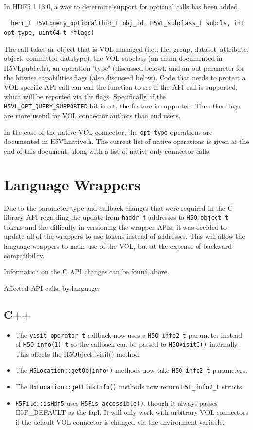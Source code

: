 In HDF5 1.13.0, a way to determine support for optional calls has been added.

\begin{lstlisting}
  herr_t H5VLquery_optional(hid_t obj_id, H5VL_subclass_t subcls, int opt_type, uint64_t *flags)
\end{lstlisting}

The call takes an object that is VOL managed (i.e.; file, group, dataset, attribute, object, committed datatype), the VOL subclass (an enum documented in H5VLpublic.h), an operation "type" (discussed below), and an out parameter for the bitwise capabilities flags (also discussed below). Code that needs to protect a VOL-specific API call can call the function to see if the API call is supported, which will be reported via the flags. Specifically, if the {\tt H5VL\_OPT\_QUERY\_SUPPORTED} bit is set, the feature is supported. The other flags are more useful for VOL connector authors than end users.

In the case of the native VOL connector, the {\tt opt\_type} operations are documented in H5VLnative.h. The current list of native operations is given at the end of this document, along with a list of native-only connector calls.


\section{Language Wrappers}

Due to the parameter type and callback changes that were required in the C
library API regarding the update from {\tt haddr\_t} addresses to
{\tt H5O\_object\_t} tokens and the difficulty in versioning the wrapper
APIs, it was decided to update all of the wrappers to use tokens instead
of addresses. This will allow the language wrappers to make use of the VOL,
but at the expense of backward compatibility.

Information on the C API changes can be found above.

Affected API calls, by language:

\subsection{C++}

\begin{itemize}
    \item The {\tt visit\_operator\_t} callback now uses a {\tt H5O\_info2\_t} parameter instead of {\tt H5O\_info(1)\_t} so the callback can be passed to {\tt H5Ovisit3()} internally. This affects the H5Object::visit() method.
    \item The {\tt H5Location::getObjinfo()} methods now take {\tt H5O\_info2\_t} parameters.
    \item The {\tt H5Location::getLinkInfo()} methods now return {\tt H5L\_info2\_t} structs.
    \item {\tt H5File::isHdf5} uses {\tt H5Fis\_accessible()}, though it always passes H5P\_DEFAULT as the fapl. It will only work with arbitrary VOL connectors if the default VOL connector is changed via the environment variable.
\end{itemize}

